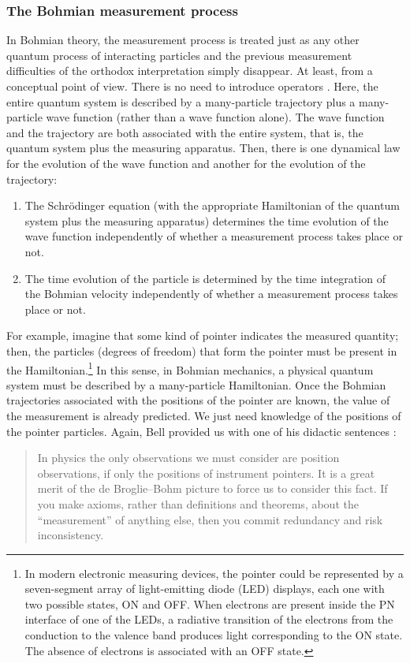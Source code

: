 \documentclass[nofootinbib, secnumarabic, amsmath, nobibnotes,11pt,aps,pra, floatfix]{revtex4-1}
\begin{document}
\subsubsection{The Bohmian measurement process}\label{meabom}

In Bohmian theory, the measurement process is treated just as any
other quantum process of interacting particles and the previous
measurement difficulties of the orthodox interpretation simply
disappear. At least, from a conceptual point of view. There is no need to introduce operators
\cite{om.Durrnaive,om.Durrllibre,om.goldstein,om.reviewabc,om.llibreph}. Here, the entire
quantum system is described by a many-particle trajectory plus a many-particle wave function
(rather than a wave function alone). The wave function and the
trajectory are both associated with the entire system, that is, the
quantum system plus the measuring apparatus. Then, there is one dynamical law for
the evolution of the wave function and another  for the
evolution of the trajectory:\enlargethispage{1pc}
\begin{enumerate}
\item The Schr\"odinger equation (with the appropriate Hamiltonian of the quantum system plus the measuring apparatus) determines the time evolution of the wave function independently of whether a measurement process takes place or not.

\item The time evolution of the particle is determined by the time integration of the Bohmian velocity independently of whether a measurement process takes place or not.
\end{enumerate}

For example, imagine that some kind of pointer indicates the
measured quantity; then, the particles (degrees of freedom) that
form the pointer must be present in the Hamiltonian.\footnote{In
modern electronic measuring devices, the pointer could be
represented by a seven-segment array of light-emitting diode (LED)
displays, each one with two possible states, ON and OFF. When
electrons are present inside the PN interface of one of the LEDs, a
radiative transition of the electrons from the conduction to the
valence band produces light corresponding to the ON state. The
absence of electrons is associated with an OFF state.} In this
sense, in Bohmian mechanics, a physical quantum system must be described by a
many-particle Hamiltonian. Once the Bohmian
trajectories associated with the positions of the pointer are known,
the value of the measurement is already predicted. We just need
knowledge of the positions of the pointer particles. Again, Bell
provided us with one of his didactic sentences \cite{om.Bell1987}:
\begin{quote}
In physics the only observations we must consider are position
observations, if only the positions of instrument pointers. It is a
great merit of the de Broglie--Bohm picture to force us to consider
this fact. If you make axioms, rather than definitions and theorems,
about the ``measurement'' of anything else, then you commit
redundancy and risk inconsistency.\enlargethispage{1pc}
\end{quote}
\end{document}
